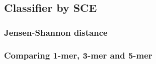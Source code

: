 \subsection{Classifier by SCE}\label{methods:ml_sce}

\subsubsection{Jensen-Shannon distance}



\subsubsection{Comparing 1-mer, 3-mer and 5-mer}



